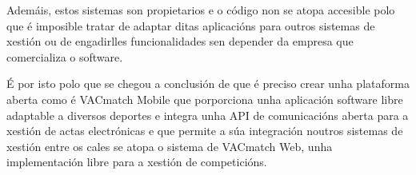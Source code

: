   Ademáis, estos sistemas son propietarios e o código non se atopa accesible 
polo que é imposible tratar de adaptar ditas aplicacións para outros 
sistemas de xestión ou de engadirlles funcionalidades sen depender da empresa 
que comercializa o software.

  É por isto polo que se chegou a conclusión de que é preciso crear unha 
plataforma aberta como é VACmatch Mobile que porporciona unha aplicación 
software libre adaptable a diversos deportes e integra unha API de comunicacións 
aberta para a xestión de actas electrónicas e que permite a súa integración 
noutros sistemas de xestión entre os cales se atopa o sistema de VACmatch Web, 
unha implementación libre para a xestión de competicións.


